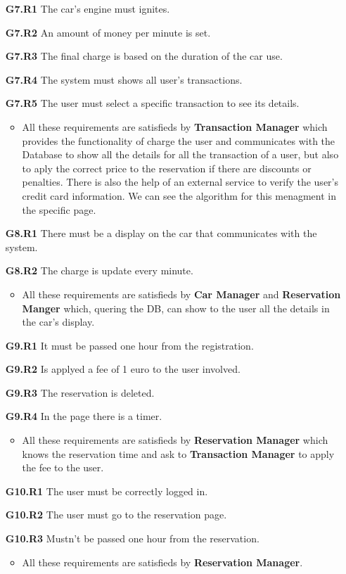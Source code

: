 \begin{itemize}
\item[\textbf{G7.R1}] The car's engine must ignites.
\item[\textbf{G7.R2}] An amount of money per minute is set.
\item[\textbf{G7.R3}] The final charge is based on the duration of the car use.
\item[\textbf{G7.R4}] The system must shows all user's transactions.
\item[\textbf{G7.R5}] The user must select a specific transaction to see its details.
\begin{itemize}
\item All these requirements are satisfieds by \textbf{Transaction Manager} which provides the functionality of charge the user and communicates with the Database to show all the details for all the transaction of a user, but also to aply the correct price to the reservation if there are discounts or penalties. There is also the help of an external service to verify the user's credit card information. We can see the algorithm for this menagment in the specific page.
\end{itemize}

\item[\textbf{G8.R1}] There must be a display on the car that communicates with the system.
\item[\textbf{G8.R2}] The charge is update every minute.
\begin{itemize}
\item All these requirements are satisfieds by \textbf{Car Manager} and \textbf{Reservation Manger} which, quering the DB, can show to the user all the details in the car's display.
\end{itemize}

\item[\textbf{G9.R1}] It must be passed one hour from the registration.
\item[\textbf{G9.R2}] Is applyed a fee of 1 euro to the user involved.
\item[\textbf{G9.R3}] The reservation is deleted.
\item[\textbf{G9.R4}] In the page there is a timer.
\begin{itemize}
\item All these requirements are satisfieds by \textbf{Reservation Manager} which knows the reservation time and ask to \textbf{Transaction Manager} to apply the fee to the user.
\end{itemize}

\item[\textbf{G10.R1}] The user must be correctly logged in.
\item[\textbf{G10.R2}] The user must go to the reservation page.
\item[\textbf{G10.R3}] Mustn't be passed one hour from the reservation.
\begin{itemize}
\item All these requirements are satisfieds by \textbf{Reservation Manager}.
\end{itemize}


\end{itemize}
